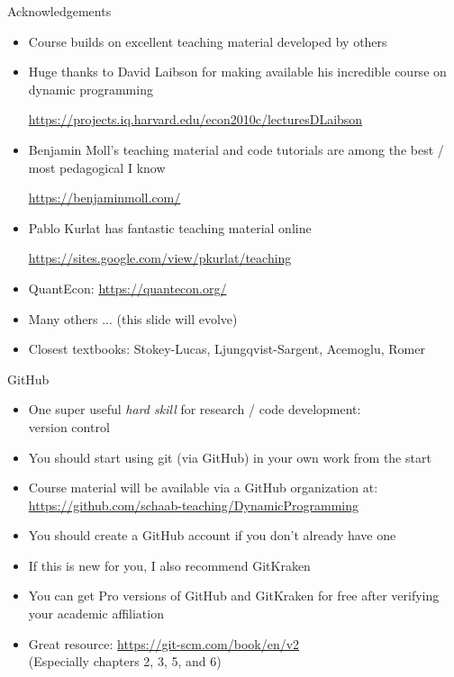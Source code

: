 \documentclass[10pt]{beamer}
\begin{document}
\begin{frame}{Acknowledgements}

{\small
\begin{itemize}
\item Course builds on excellent teaching material developed by others

\item Huge thanks to David Laibson for making available his incredible course on dynamic programming 

\url{https://projects.iq.harvard.edu/econ2010c/lecturesDLaibson}

\item Benjamin Moll's teaching material and code tutorials are among the best / most pedagogical I know

\url{https://benjaminmoll.com/}

\item Pablo Kurlat has fantastic teaching material online

\url{https://sites.google.com/view/pkurlat/teaching}

\item QuantEcon: \url{https://quantecon.org/}

\item Many others ... (this slide will evolve)

\item Closest textbooks: Stokey-Lucas, Ljungqvist-Sargent, Acemoglu, Romer

\end{itemize}
}

\end{frame}


\begin{frame}{GitHub}
\begin{itemize}
\item One super useful \textit{hard skill} for research / code development: \\
version control

\item You should start using git (via GitHub) in your own work from the start

\item Course material will be available via a GitHub organization at:
\url{https://github.com/schaab-teaching/DynamicProgramming}

\item You should create a GitHub account if you don't already have one

\item If this is new for you, I also recommend GitKraken

\item You can get Pro versions of GitHub and GitKraken for free after verifying your academic affiliation

\item Great resource: \url{https://git-scm.com/book/en/v2} \\
(Especially chapters 2, 3, 5, and 6)

\end{itemize}
\end{frame}
\end{document}
